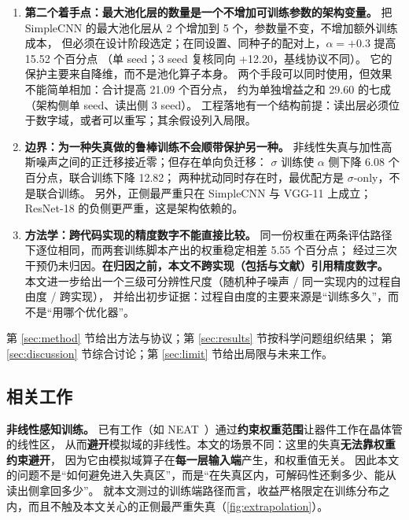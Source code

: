 \documentclass[11pt,a4paper]{ctexart}
\begin{document}
\begin{enumerate}[leftmargin=2em,itemsep=2pt]
        （三个主干上分别下降 11.85/33.83/12.88 个百分点）。
  \item \textbf{第二个着手点：最大池化层的数量是一个不增加可训练参数的架构变量。}
        把 SimpleCNN 的最大池化层从 2 个增加到 5 个，参数量不变，不增加额外训练成本，
        但必须在设计阶段选定；在同设置、同种子的配对上，$\alpha=+0.3$ 提高 15.52 个百分点
        （单 seed；3 seed 复核同向 +12.20，基线协议不同）。
        它的保护主要来自降维，而不是池化算子本身。
        两个手段可以同时使用，但效果不能简单相加：合计提高 21.09 个百分点，
        约为单独增益之和 29.60 的七成（架构侧单 seed、读出侧 3 seed）。
        工程落地有一个结构前提：读出层必须位于数字域，或者可以重写；其余假设列入局限。
  \item \textbf{边界：为一种失真做的鲁棒训练不会顺带保护另一种。}
        非线性失真与加性高斯噪声之间的正迁移接近零；但存在单向负迁移：
        $\sigma$ 训练使 $\alpha$ 侧下降 6.08 个百分点，联合训练下降 12.82；
        两种扰动同时存在时，最优配方是 $\sigma$-only，不是联合训练。
        另外，正侧最严重只在 SimpleCNN 与 VGG-11 上成立；ResNet-18 的负侧更严重，这是架构依赖的。
  \item \textbf{方法学：跨代码实现的精度数字不能直接比较。}
        同一份权重在两条评估路径下逐位相同，而两套训练脚本产出的权重稳定相差 5.55 个百分点；
        经过三次干预仍未归因。\textbf{在归因之前，本文不跨实现（包括与文献）引用精度数字。}
        本文进一步给出一个三级可分辨性尺度（随机种子噪声 / 同一实现内的过程自由度 / 跨实现），
        并给出初步证据：过程自由度的主要来源是“训练多久”，而不是“用哪个优化器”。
\end{enumerate}

第 \ref{sec:method} 节给出方法与协议；第 \ref{sec:results} 节按科学问题组织结果；
第 \ref{sec:discussion} 节综合讨论；第 \ref{sec:limit} 节给出局限与未来工作。

\subsection{相关工作}
\label{sec:related}

\textbf{非线性感知训练。}
已有工作（如 NEAT~\cite{neat}）通过\textbf{约束权重范围}让器件工作在晶体管的线性区，
从而\textbf{避开}模拟域的非线性。本文的场景不同：这里的失真\textbf{无法靠权重约束避开}，
因为它由模拟域算子在\textbf{每一层输入端}产生，和权重值无关。
因此本文的问题不是“如何避免进入失真区”，而是“在失真区内，可解码性还剩多少、能从读出侧拿回多少”。
就本文测过的训练端路径而言，收益严格限定在训练分布之内，而且不触及本文关心的正侧最严重失真（\cref{fig:extrapolation}）。
\end{document}
